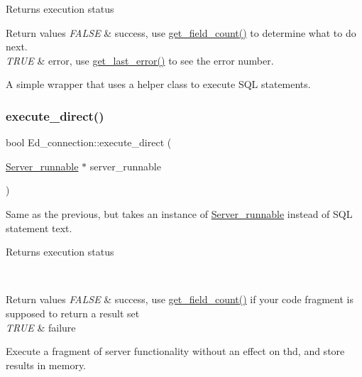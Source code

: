\begin{DoxyReturn}{Returns}
execution status 
\end{DoxyReturn}

\begin{DoxyRetVals}{Return values}
{\em F\+A\+L\+SE} & success, use \mbox{\hyperlink{classEd__connection_af704fb99d9029578af2d1acc301b8d51}{get\+\_\+field\+\_\+count()}} to determine what to do next. \\
\hline
{\em T\+R\+UE} & error, use \mbox{\hyperlink{classEd__connection_a420c219d0c2e058af3666076a2bfaa17}{get\+\_\+last\+\_\+error()}} to see the error number.\\
\hline
\end{DoxyRetVals}
A simple wrapper that uses a helper class to execute S\+QL statements. \mbox{\label{classEd__connection_afd0499324ba204c8a00480a3706c5bfb}} 
\subsubsection{\texorpdfstring{execute\+\_\+direct()}{execute\_direct()}\hspace{0.1cm}{\footnotesize\ttfamily [2/2]}}
{\footnotesize\ttfamily bool Ed\+\_\+connection\+::execute\+\_\+direct (\begin{DoxyParamCaption}\item[{\mbox{\hyperlink{classServer__runnable}{Server\+\_\+runnable}} $\ast$}]{server\+\_\+runnable }\end{DoxyParamCaption})}

Same as the previous, but takes an instance of \mbox{\hyperlink{classServer__runnable}{Server\+\_\+runnable}} instead of S\+QL statement text.

\begin{DoxyReturn}{Returns}
execution status
\end{DoxyReturn}
~\newline

\begin{DoxyRetVals}{Return values}
{\em F\+A\+L\+SE} & success, use \mbox{\hyperlink{classEd__connection_af704fb99d9029578af2d1acc301b8d51}{get\+\_\+field\+\_\+count()}} if your code fragment is supposed to return a result set \\
\hline
{\em T\+R\+UE} & failure\\
\hline
\end{DoxyRetVals}
Execute a fragment of server functionality without an effect on thd, and store results in memory.

